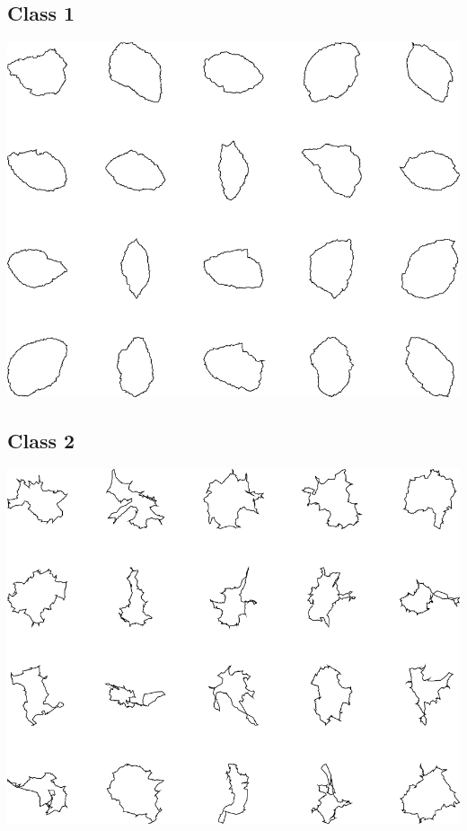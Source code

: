 \documentclass{book}
\begin{document}
\subsection{Class 1}
\includegraphics[width=6in]{output/3.learning/scaled_nts/scaled_nts_1.png}
\subsection{Class 2}
\includegraphics[width=6in]{output/3.learning/scaled_nts/scaled_nts_2.png}
\end{document}
